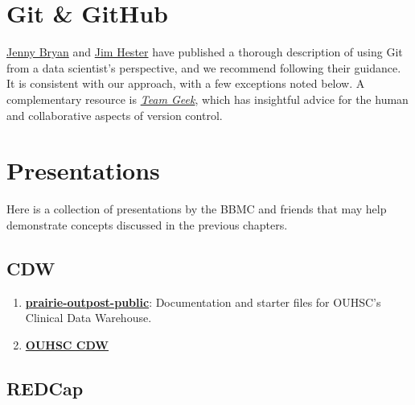 \documentclass[]{book}
\providecommand{\tightlist}{%
  \setlength{\itemsep}{0pt}\setlength{\parskip}{0pt}}
\begin{document}
\hypertarget{git-github}{%
\chapter{Git \& GitHub}\label{git-github}}

\href{https://github.com/jennybc}{Jenny Bryan} and \href{https://github.com/jimhester}{Jim Hester} have published a thorough description of using Git from a data scientist's perspective, and we recommend following their guidance. It is consistent with our approach, with a few exceptions noted below. A complementary resource is \emph{\href{https://smile.amazon.com/dp/1449302440}{Team Geek}}, which has insightful advice for the human and collaborative aspects of version control.

\hypertarget{presentations}{%
\chapter{Presentations}\label{presentations}}

Here is a collection of presentations by the BBMC and friends that may help demonstrate concepts discussed in the previous chapters.

\hypertarget{cdw}{%
\section{CDW}\label{cdw}}

\begin{enumerate}
\def\labelenumi{\arabic{enumi}.}
\tightlist
\item
  \textbf{\href{https://github.com/OuhscBbmc/prairie-outpost-public}{prairie-outpost-public}}: Documentation and starter files for OUHSC's Clinical Data Warehouse.
\item
  \textbf{\href{https://github.com/OuhscBbmc/BbmcResources/blob/master/Publications/presentation-2015-11-18-cdw-bse/clinical-data-warehouse-bse.pdf}{OUHSC CDW}}
\end{enumerate}

\hypertarget{redcap}{%
\section{REDCap}\label{redcap}}
\end{document}
